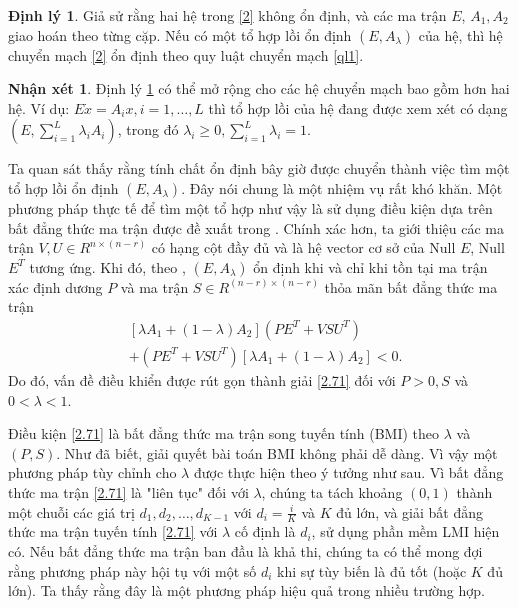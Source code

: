 \documentclass[12pt,a4paper]{report}
\theoremstyle{definition}
\newtheorem{dl}{Định lý}
\newtheorem{nx}{Nhận xét}
\theoremstyle{definition}
\numberwithin{dl}{chapter}
\numberwithin{vd}{chapter}
\numberwithin{corollary}{chapter}
\numberwithin{lemma}{chapter}
\numberwithin{md}{chapter}
\numberwithin{dn}{chapter}
\numberwithin{cy}{chapter}
\numberwithin{nx}{chapter}
\begin{document}
\begin{dl}\label{dl2.5} Giả sử rằng hai hệ trong \eqref{2}  không ổn định, và các ma trận  $E$,  $A_{1}, A_{2}$ giao hoán theo từng cặp. Nếu có một tổ hợp lồi ổn định $\left(E, A_{\lambda}\right)$ của hệ, thì hệ chuyển mạch \eqref{2} ổn định theo quy luật chuyển mạch \ref{ql1}.
\end{dl}
\begin{nx} \label{nx2.7} Định lý \ref{dl2.5} có thể mở rộng cho các hệ chuyển mạch bao gồm hơn hai hệ. Ví dụ: $E \dot{x}=A_{i} x, i=1, \dots, L$ thì tổ hợp lồi của hệ đang được xem xét có dạng $\left(E, \sum_{i=1}^{L} \lambda_{i} A_{i}\right)$, trong đó $\lambda_{i} \geq 0, \sum_{i=1}^{L} \lambda_{i}=1 .$
\end{nx}
Ta quan sát thấy rằng tính chất ổn định bây giờ được chuyển thành việc tìm một tổ hợp lồi ổn định $\left(E, A_{\lambda}\right)$. Đây nói chung là một nhiệm vụ rất khó khăn. Một phương pháp thực tế để tìm một tổ hợp như vậy là sử dụng điều kiện dựa trên bất đẳng thức ma trận được đề xuất trong \cite{E99}. Chính xác hơn, ta giới thiệu các ma trận $V, U \in R^{n \times(n-r)}$ có hạng cột đầy đủ và là hệ vector cơ sở của Null $E$, Null $E^{T}$ tương ứng. Khi đó, theo \cite{E99}, $\left(E, A_{\lambda}\right)$ ổn định khi và chỉ khi tồn tại ma trận xác định dương $P$ và ma trận $S \in R^{(n-r) \times(n-r)}$ thỏa mãn bất đẳng thức ma trận
\begin{equation}\label{2.71}
\begin{aligned}
&{\left[\lambda A_{1}+(1-\lambda) A_{2}\right]\left(P E^{T}+V S U^{T}\right)} \\
&+\left(P E^{T}+V S U^{T}\right)\left[\lambda A_{1}+(1-\lambda) A_{2}\right]<0 .
\end{aligned} 
\end{equation}
Do đó, vấn đề điều khiển được rút gọn thành giải \eqref{2.71} đối với $P>0, S$ và $0<\lambda<1$.

Điều kiện \eqref{2.71} là bất đẳng thức ma trận song tuyến tính (BMI) theo $\lambda$ và $(P, S)$. Như đã biết, giải quyết bài toán BMI không phải dễ dàng. Vì vậy một phương pháp tùy chỉnh cho $\lambda$ được thực hiện theo ý tưởng như sau. Vì bất đẳng thức ma trận \eqref{2.71} là "liên tục" đối với $\lambda$, chúng ta tách khoảng $(0,1)$ thành một chuỗi các giá trị $d_{1}, d_{2}, \dots, d_{K-1}$ với $d_{i}=\frac{i}{K}$ và $K$ đủ lớn, và giải bất đẳng thức ma trận tuyến tính \eqref{2.71} với $\lambda$ cố định là $d_{i}$, sử dụng phần mềm LMI hiện có. Nếu bất đẳng thức ma trận ban đầu là khả thi, chúng ta có thể mong đợi rằng phương pháp này hội tụ với một số $d_{i}$ khi sự tùy biến là đủ tốt (hoặc $K$ đủ lớn). Ta thấy rằng đây là một phương pháp hiệu quả trong nhiều trường hợp.
\end{document}
